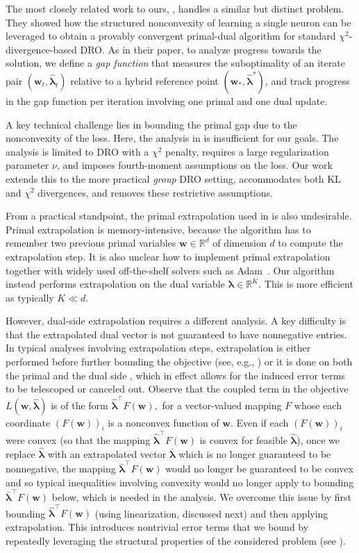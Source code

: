 \documentclass[11pt]{article}
\newcounter{thm}
\numberwithin{thm}{section}
\theoremstyle{plain}
\theoremstyle{definition}
\theoremstyle{remark} \newtheorem{remark}[thm]{Remark}
\def\vlambda{{\bm{\lambda}}}
\def\vw{{\bm{w}}}
\newcommand{\R}{\mathbb{R}}
\newcommand{\evlambda}{\widehat{\vlambda}}
\begin{document}
The most closely related work to ours, \citep{Li2024shifts}, handles a similar but distinct problem. They showed how the structured nonconvexity of learning a single neuron can be leveraged 
to obtain a provably convergent primal-dual algorithm for standard $\chi^2$-divergence-based DRO.
As in their paper, to analyze progress towards the solution, 
we define a \emph{gap function} that measures the suboptimality of an iterate pair 
\((\vw_t,\evlambda_t)\) relative to a hybrid reference point \((\vw_*,\evlambda^*)\), and track progress in the gap function per iteration involving one primal and one dual update. 


A key technical challenge lies in bounding the primal gap due to the nonconvexity of the loss. 
Here, the analysis in \citep{Li2024shifts} is insufficient for our goals. 
The analysis is limited to DRO with a $\chi^2$ penalty, 
requires a large regularization parameter $\nu$, 
and imposes fourth-moment assumptions on the loss. 
Our work extends this to the more practical \emph{group} DRO setting, 
accommodates both KL and $\chi^2$ divergences, 
and removes these restrictive assumptions.

From a practical standpoint, the primal extrapolation used in \citep{Li2024shifts} is also undesirable.
Primal extrapolation is memory-intensive, 
because the algorithm has to remember 
two previous primal variables $\vw \in \R^d$ of dimension $d$ 
to compute the extrapolation step. 
It is also unclear how to implement primal extrapolation 
together with widely used off-the-shelf solvers such as Adam~\citep{kingma2015adam}.
Our algorithm instead performs extrapolation on the dual variable $\vlambda \in \R^K$. 
This is more efficient as typically $K \ll d$. 

However, dual-side extrapolation requires a different analysis. 
A key difficulty is that the extrapolated dual vector is not guaranteed to have nonnegative entries. In typical analyses involving extrapolation steps, extrapolation is either performed before further bounding the objective (see, e.g., \citep{chambolle2011first,kotsalis2022simple}) or it is done on both the primal and the dual side \citep{mehta2025min}, which in effect allows for the induced error terms to be telescoped or canceled out. Observe that the coupled term in the objective $L(\vw,\evlambda)$ is of the form $\evlambda^\top F(\vw),$ for a vector-valued mapping $F$ whose each coordinate $(F(\vw))_i$ is a nonconvex function of $\vw$. Even if each $(F(\vw))_i$ were convex (so that the mapping $\evlambda^\top F(\vw)$ is convex for feasible $\evlambda$), once we replace $\evlambda$ with an extrapolated vector $\bar{\vlambda}$ which is no longer guaranteed to be nonnegative, the mapping $\bar{\vlambda}^\top F(\vw)$ would no longer be guaranteed to be convex and so typical inequalities involving convexity would no longer apply to bounding $\bar{\vlambda}^\top F(\vw)$ below, which is needed in the analysis. We overcome this issue by first bounding $\evlambda^\top F(\vw)$ (using linearization, discussed next) and then  applying extrapolation. This introduces nontrivial error terms that we bound by repeatedly leveraging the structural properties of the considered problem (see ).  
\end{document}
